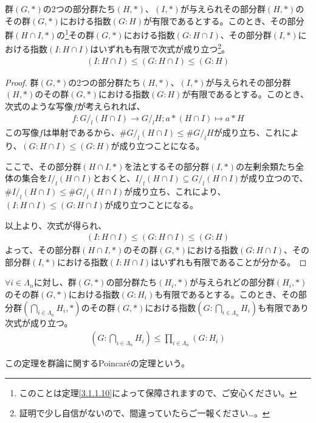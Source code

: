 \documentclass[dvipdfmx]{jsarticle}
\begin{document}
\begin{thm}\label{3.1.1.37}
群$(G,*)$の2つの部分群たち$(H,*)$、$(I,*)$が与えられその部分群$(H,*)$のその群$(G,*)$における指数$(G:H)$が有限であるとする。このとき、その部分群$(H \cap I,*)$の\footnote{このことは定理\ref{3.1.1.10}によって保障されますので、ご安心ください。}その群$(G,*)$における指数$(G:H \cap I)$、その部分群$(I,*)$における指数$(I:H \cap I)$はいずれも有限で次式が成り立つ\footnote{証明で少し自信がないので、間違っていたらご一報ください…。}。
\begin{align*}
(I:H \cap I) \leq (G:H \cap I) \leq (G:H)
\end{align*}
\end{thm}
\begin{proof}
群$(G,*)$の2つの部分群たち$(H,*)$、$(I,*)$が与えられその部分群$(H,*)$のその群$(G,*)$における指数$(G:H)$が有限であるとする。このとき、次式のような写像$f$が考えられれば、
\begin{align*}
f:{G}/_l {(H \cap I)} \rightarrow {G}/_l {H};a*(H \cap I) \mapsto a*H
\end{align*}
この写像$f$は単射であるから、$\#{G}/_l {(H \cap I)} \leq \#{G}/_l {H}$が成り立ち、これにより、$(G:H \cap I) \leq (G:H)$が成り立つことになる。\par
ここで、その部分群$(H \cap I,*)$を法とするその部分群$(I,*)$の左剰余類たち全体の集合を${I}/_l {(H \cap I)}$とおくと、${I}/_l {(H \cap I)} \subseteq {G}/_l {(H \cap I)}$が成り立つので、$\#{I}/_l {(H \cap I)} \leq \#{G}/_l {(H \cap I)}$が成り立ち、これにより、$(I:H \cap I) \leq (G:H \cap I)$が成り立つことになる。\par
以上より、次式が得られ、
\begin{align*}
(I:H \cap I) \leq (G:H \cap I) \leq (G:H)
\end{align*}
よって、その部分群$(H \cap I,*)$のその群$(G,*)$における指数$(G:H \cap I)$、その部分群$(I,*)$における指数$(I:H \cap I)$はいずれも有限であることが分かる。
\end{proof}
\begin{thm}[群論に関するPoincaréの定理]\label{3.1.1.38}
$\forall i \in \varLambda_{n}$に対し、群$(G,*)$の部分群たち$\left( H_{i},* \right)$が与えられどの部分群$\left( H_{i},* \right)$のその群$(G,*)$における指数$\left( G:H_{i} \right)$も有限であるとする。このとき、その部分群$\left( \bigcap_{i \in \varLambda_{n}} H_{i},* \right)$のその群$(G,*)$における指数$\left( G:\bigcap_{i \in \varLambda_{n}} H_{i} \right)$も有限であり次式が成り立つ。
\begin{align*}
\left( G:\bigcap_{i \in \varLambda_{n}} H_{i} \right) \leq \prod_{i \in \varLambda_{n}} \left( G:H_{i} \right)
\end{align*}\par
この定理を群論に関するPoincaréの定理という。
\end{thm}
\end{document}
